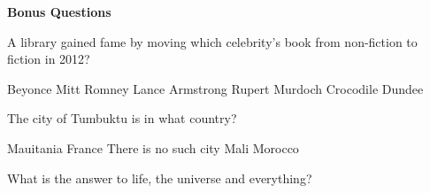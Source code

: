 \documentclass[10pt,addpoints]{exam}
\begin{document}
\begin{questions}
\begin{minipage}{\linewidth}
\end{minipage}





\newpage
\begin{center}
{\Large \textbf{Bonus Questions}}
\end{center}

\par\vspace{0.100000in}\begin{minipage}{\linewidth}
\bonusquestion[2]
A library gained fame by moving which celebrity's book from non-fiction to fiction in 2012?
\medskip
\begin{choices}
\choice Beyonce
\choice Mitt Romney
\choice Lance Armstrong
\choice Rupert Murdoch
\choice Crocodile Dundee
\end{choices}
\setlength\answerlinelength{1in}
\answerline[C]

\end{minipage}


\par\vspace{0.100000in}\begin{minipage}{\linewidth}
\bonusquestion[2]
The city of Tumbuktu is in what country?
\medskip
\begin{choices}
\choice Mauitania
\choice France
\choice There is no such city
\choice Mali
\choice Morocco
\end{choices}
\setlength\answerlinelength{1in}
\answerline[D]

\end{minipage}


\par\vspace{0.100000in}\begin{minipage}{\linewidth}
\vspace{.35cm}\bonusquestion[2]
What is the answer to life, the universe and everything?
\vspace{.25cm}\setlength\answerlinelength{1in}
\answerline[42]
\end{minipage}





\end{questions}
\end{document}
